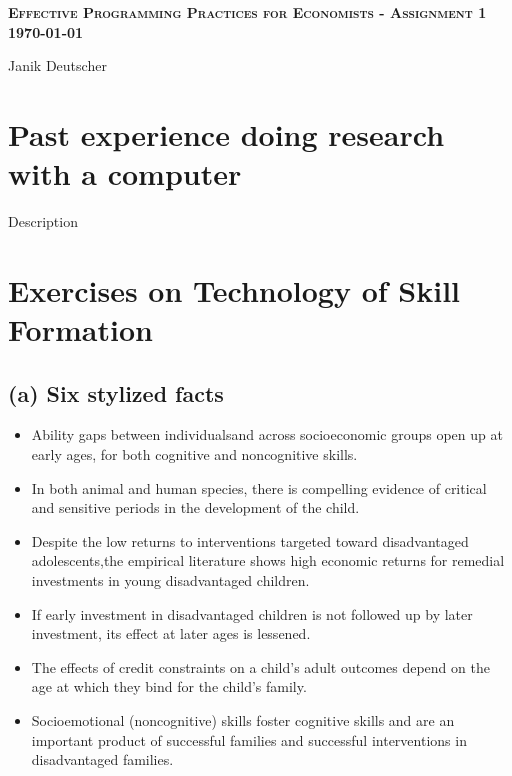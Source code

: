 \documentclass[11pt]{article}
\theoremstyle{definition}
\newcommand{\thedate}{\today}
\begin{document}
    \begin{center}
        \textbf{\huge \scshape Effective Programming Practices for Economists - Assignment 1} \\ \vspace{1pt}
    \centering\textbf{\thedate} \\ 
    \item Janik Deutscher
    \end{center}

\section{Past experience doing research with a computer}  
Description 



\section{Exercises on Technology of Skill Formation}

\subsection*{(a) Six stylized facts}
\begin{itemize}
    \item Ability gaps between individualsand  across  socioeconomic  groups  open  up  at  early  ages,  for  both  cognitive  and  noncognitive skills.
    \item In  both  animal  and  human  species,  there  is  compelling  evidence  of  critical  and
    sensitive periods in the development of the child.
    \item Despite the low returns to interventions targeted toward disadvantaged adolescents,the empirical literature shows high economic returns for remedial investments in young disadvantaged children.
    \item If early investment in disadvantaged children is not followed up by later investment, its effect at later ages is lessened.
    \item The effects of credit constraints on a child’s adult outcomes depend on the age at which they bind for the child’s family.
    \item Socioemotional (noncognitive) skills foster cognitive skills and are an important product of successful families and successful interventions in disadvantaged families.
\end{itemize}
\end{document}
